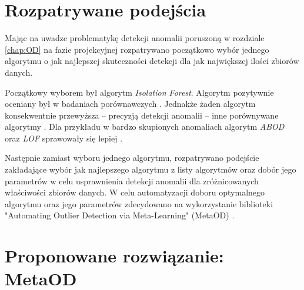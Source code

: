 \section{Rozpatrywane podejścia}
Mając na uwadze problematykę detekcji anomalii poruszoną w rozdziale \ref{chap:OD} na fazie projekcyjnej rozpatrywano początkowo wybór jednego algorytmu o jak najlepszej skuteczności detekcji dla jak największej ilości zbiorów danych. 

Początkowy wyborem był algorytm \textit{Isolation Forest}\cite{iforest}. Algorytm pozytywnie oceniany był w badaniach porównawczych \cite{emmott2015meta,aggarwal2017ens}. Jednakże żaden algorytm konsekwentnie przewyższa -- precyzją detekcji anomalii -- inne porównywane algorytmy \cite{aggarwal2017ens}. Dla przykładu w bardzo skupionych anomaliach algorytm \textit{ABOD} \cite{abod} oraz \textit{LOF} \cite{lof} sprawowały się lepiej \cite{emmott2015meta}. 

Następnie zamiast wyboru jednego algorytmu, rozpatrywano podejście zakładające wybór jak najlepszego algorytmu z listy algorytmów oraz dobór jego parametrów w celu usprawnienia detekcji anomalii dla zróżnicowanych właściwości zbiorów danych. 
W celu automatyzacji doboru optymalnego algorytmu oraz jego parametrów zdecydowano na wykorzystanie biblioteki "Automating Outlier Detection via Meta-Learning" (MetaOD) \cite{zhao2020metaod}. 

\section{Proponowane rozwiązanie: MetaOD}
